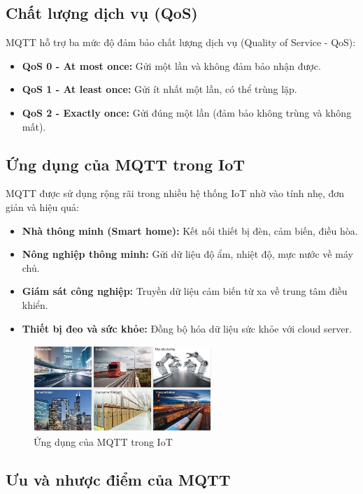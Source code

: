\subsection{Chất lượng dịch vụ (QoS)}

MQTT hỗ trợ ba mức độ đảm bảo chất lượng dịch vụ (Quality of Service - QoS):

\begin{itemize}
    \item \textbf{QoS 0 - At most once:} Gửi một lần và không đảm bảo nhận được.
    \item \textbf{QoS 1 - At least once:} Gửi ít nhất một lần, có thể trùng lặp.
    \item \textbf{QoS 2 - Exactly once:} Gửi đúng một lần (đảm bảo không trùng và không mất).
\end{itemize}

\subsection{Ứng dụng của MQTT trong IoT}

MQTT được sử dụng rộng rãi trong nhiều hệ thống IoT nhờ vào tính nhẹ, đơn giản và hiệu quả:

\begin{itemize}
    \item \textbf{Nhà thông minh (Smart home):} Kết nối thiết bị đèn, cảm biến, điều hòa.
    \item \textbf{Nông nghiệp thông minh:} Gửi dữ liệu độ ẩm, nhiệt độ, mực nước về máy chủ.
    \item \textbf{Giám sát công nghiệp:} Truyền dữ liệu cảm biến từ xa về trung tâm điều khiển.
    \item \textbf{Thiết bị đeo và sức khỏe:} Đồng bộ hóa dữ liệu sức khỏe với cloud server.
\end{itemize}
\begin{figure}[H]
  \centering
  \includegraphics[width=0.6\textwidth]{Images/ung-dung-mqtt.png}
  \caption{Ứng dụng của MQTT trong IoT}
\end{figure}
\subsection{Ưu và nhược điểm của MQTT}

